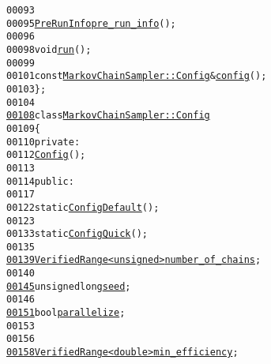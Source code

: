 \begin{footnotesize}
\begin{alltt}
00093 
00095             \hyperlink{structeos_1_1MarkovChainSampler_1_1PreRunInfo}{PreRunInfo} \hyperlink{classeos_1_1MarkovChainSampler_ae3032467d9678870bb30f82ae060c043}{pre_run_info}();
00096 
00098             \textcolor{keywordtype}{void} \hyperlink{classeos_1_1MarkovChainSampler_a67fdd21c364b34796c9c5ba2b3b0b785}{run}();
00099 
00101             \textcolor{keyword}{const} \hyperlink{classeos_1_1MarkovChainSampler_1_1Config}{MarkovChainSampler::Config} & \hyperlink{classeos_1_1MarkovChainSampler_a277acc86b109ca342be462c0e9d7c175}{config}();
00103     \};
00104 
\hypertarget{markov__chain__sampler_8hh_source_l00108}{}\hyperlink{classeos_1_1MarkovChainSampler_1_1Config}{00108}     \textcolor{keyword}{class }\hyperlink{classeos_1_1MarkovChainSampler_1_1Config}{MarkovChainSampler::Config}
00109     \{
00110         \textcolor{keyword}{private}:
00112             \hyperlink{classeos_1_1MarkovChainSampler_1_1Config}{Config}();
00113 
00114         \textcolor{keyword}{public}:
00117 
00122             \textcolor{keyword}{static} \hyperlink{classeos_1_1MarkovChainSampler_1_1Config}{Config} \hyperlink{classeos_1_1MarkovChainSampler_1_1Config_a873df585d161c55e45b69fe45def8bd0}{Default}();
00123 
00133             \textcolor{keyword}{static} \hyperlink{classeos_1_1MarkovChainSampler_1_1Config}{Config} \hyperlink{classeos_1_1MarkovChainSampler_1_1Config_aae4d353bed05e0921697290e7e93f116}{Quick}();
00135 
\hypertarget{markov__chain__sampler_8hh_source_l00139}{}\hyperlink{classeos_1_1MarkovChainSampler_1_1Config_a802b6d235de40517746b7fc4147d8c7b}{00139}             \hyperlink{classeos_1_1VerifiedRange}{VerifiedRange<unsigned>} \hyperlink{classeos_1_1MarkovChainSampler_1_1Config_a802b6d235de40517746b7fc4147d8c7b}{number_of_chains};
00140 
\hypertarget{markov__chain__sampler_8hh_source_l00145}{}\hyperlink{classeos_1_1MarkovChainSampler_1_1Config_ad969cd46104eb385033df4574079dc57}{00145}             \textcolor{keywordtype}{unsigned} \textcolor{keywordtype}{long} \hyperlink{classeos_1_1MarkovChainSampler_1_1Config_ad969cd46104eb385033df4574079dc57}{seed};
00146 
\hypertarget{markov__chain__sampler_8hh_source_l00151}{}\hyperlink{classeos_1_1MarkovChainSampler_1_1Config_ad66eb9a48dd6aa736cf476322ed5b13e}{00151}             \textcolor{keywordtype}{bool} \hyperlink{classeos_1_1MarkovChainSampler_1_1Config_ad66eb9a48dd6aa736cf476322ed5b13e}{parallelize};
00153 
00156 
\hypertarget{markov__chain__sampler_8hh_source_l00158}{}\hyperlink{classeos_1_1MarkovChainSampler_1_1Config_a0d907985d270035dbc3fc2235667ed0e}{00158}             \hyperlink{classeos_1_1VerifiedRange}{VerifiedRange<double>} \hyperlink{classeos_1_1MarkovChainSampler_1_1Config_a0d907985d270035dbc3fc2235667ed0e}{min_efficiency};

\end{alltt}
\end{footnotesize}
